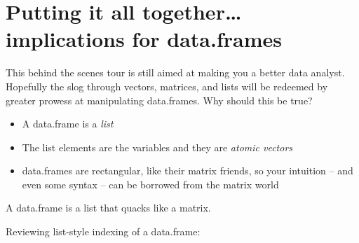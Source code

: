 \documentclass[
]{book}
\newenvironment{Shaded}{\begin{snugshade}}{\end{snugshade}}
\newcommand{\CommentTok}[1]{\textcolor[rgb]{0.56,0.35,0.01}{\textit{#1}}}
\newcommand{\DataTypeTok}[1]{\textcolor[rgb]{0.13,0.29,0.53}{#1}}
\newcommand{\DecValTok}[1]{\textcolor[rgb]{0.00,0.00,0.81}{#1}}
\newcommand{\KeywordTok}[1]{\textcolor[rgb]{0.13,0.29,0.53}{\textbf{#1}}}
\newcommand{\NormalTok}[1]{#1}
\newcommand{\OperatorTok}[1]{\textcolor[rgb]{0.81,0.36,0.00}{\textbf{#1}}}
\newcommand{\StringTok}[1]{\textcolor[rgb]{0.31,0.60,0.02}{#1}}
\providecommand{\tightlist}{%
  \setlength{\itemsep}{0pt}\setlength{\parskip}{0pt}}
\begin{document}
\begin{Shaded}
\end{Shaded}

\hypertarget{putting-it-all-togetherimplications-for-data.frames}{%
\section{Putting it all together\ldots implications for data.frames}\label{putting-it-all-togetherimplications-for-data.frames}}

This behind the scenes tour is still aimed at making you a better data analyst. Hopefully the slog through vectors, matrices, and lists will be redeemed by greater prowess at manipulating data.frames. Why should this be true?

\begin{itemize}
\tightlist
\item
  A data.frame is a \emph{list}
\item
  The list elements are the variables and they are \emph{atomic vectors}
\item
  data.frames are rectangular, like their matrix friends, so your intuition -- and even some syntax -- can be borrowed from the matrix world
\end{itemize}

A data.frame is a list that quacks like a matrix.

Reviewing list-style indexing of a data.frame:
\end{document}

